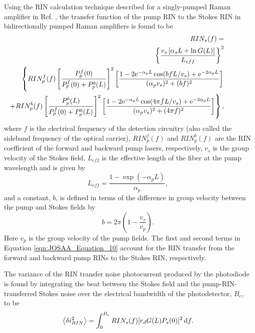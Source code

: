 Using the RIN calculation technique described for a singly-pumped Raman amplifier in Ref. \cite{fludger2001pump}, the transfer function of the pump RIN to the Stokes RIN in bidirectionally pumped Raman amplifiers is found to be
\begin{eqnarray}
&&\hspace{-1.7cm}RIN_s(f) = \nonumber\\
&&\hspace{-1.5cm}\left\{\frac{v_s\left[\alpha_s L + \ln G(L)\right]}{L_{eff}}\right\}^2 \nonumber\\
&&\hspace{-1.5cm}\left\{RIN_p^f(f) \left[\frac{P_p^f(0)}{P_p^f(0)+P_p^b(L)}\right]^2 \left[\frac{1-2\mathrm{e}^{-\alpha_p L}\cos(bfL/v_s)+\mathrm{e}^{-2 \alpha_p L}}{(\alpha_p v_s)^2+(b f)^2}\right] \right.\nonumber\\
&&\hspace{-1.5cm} \left.+RIN_p^b(f) \left[\frac{P_p^b(L)}{P_p^f(0)+P_p^b(L)}\right]^2 \left[\frac{1-2\mathrm{e}^{-\alpha_p L}\cos(4 \pi f L/v_s)+\mathrm{e}^{-2 \alpha_p L}}{(\alpha_p v_s)^2+(4 \pi f)^2}\right]\right\}, \label{eqn:JOSAA_Equation_10}
\end{eqnarray}
where $f$ is the electrical frequency of the detection circuitry (also called the sideband frequency of the optical carrier), $RIN_p^f(f)$ and $RIN_p^b(f)$ are the RIN coefficient of the forward and backward pump lasers, respectively, $v_s$ is the group velocity of the Stokes field, $L_{eff}$ is the effective length of the fiber at the pump wavelength and is given by
\begin{equation}
L_{eff}=\frac{1-\exp(-\alpha_p L)}{\alpha_p},\label{eqn:JOSAA_Equation_11}
\end{equation}
and a constant, $b$, is defined in terms of the difference in group velocity between the pump and Stokes fields by
\begin{equation}
b = 2\pi\left(1-\frac{v_s}{v_p}\right).\label{eqn:JOSAA_Equation_12}
\end{equation}
Here $v_p$ is the group velocity of the pump fields. The first and second terms in Equation \eqref{eqn:JOSAA_Equation_10} account for the RIN transfer from the forward and backward pump RINs to the Stokes RIN, respectively.

The variance of the RIN transfer noise photocurrent produced by the photodiode is found by integrating the beat between the Stokes field and the pump-RIN-transferred Stokes noise over the electrical bandwidth of the photodetector, $B_e$, to be
\begin{equation}
\left\langle \delta i_{RIN}^2\right\rangle = \int_0^{B_e}RIN_s(f) [r_d G(L) P_s(0)]^2 \,\mathrm{d} f.\label{eqn:JOSAA_Equation_13}
\end{equation}

